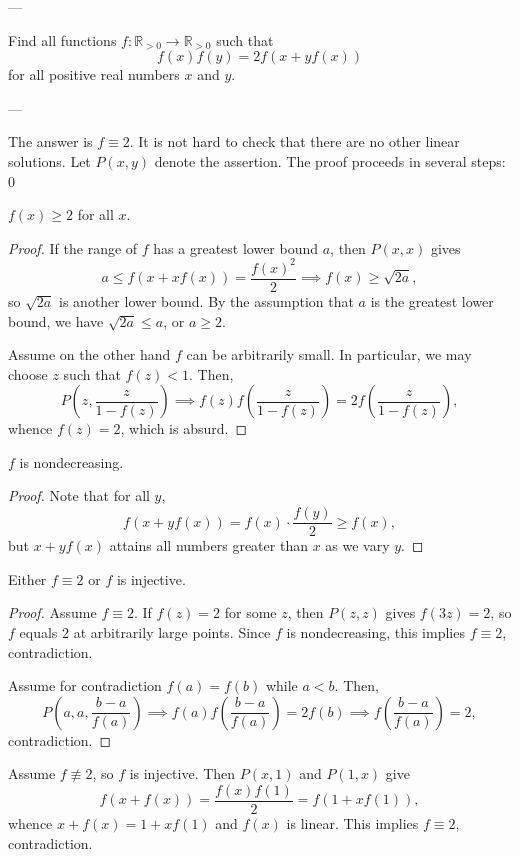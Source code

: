 
---

Find all functions $f:\mathbb R_{>0}\to\mathbb R_{>0}$ such that \[f(x)f(y)=2f(x+yf(x))\]
for all positive real numbers $x$ and $y$.

---

The answer is $f\equiv2$. It is not hard to check that there are no other linear solutions. Let $P(x,y)$ denote the assertion. The proof proceeds in several steps:
\setcounter{iclaim}0
\begin{iclaim}
    $f(x)\ge2$ for all $x$.
\end{iclaim}
\begin{proof}
    If the range of $f$ has a greatest lower bound $a$, then $P(x,x)$ gives \[a\le f(x+xf(x))=\frac{f(x)^2}2\implies f(x)\ge\sqrt{2a},\]
    so $\sqrt{2a}$ is another lower bound. By the assumption that $a$ is the greatest lower bound, we have $\sqrt{2a}\le a$, or $a\ge2$.

    Assume on the other hand $f$ can be arbitrarily small. In particular, we may choose $z$ such that $f(z)<1$. Then, \[P\left(z,\frac z{1-f(z)}\right)\implies f(z)f\left(\frac z{1-f(z)}\right)=2f\left(\frac z{1-f(z)}\right),\]
    whence $f(z)=2$, which is absurd.
\end{proof}
\begin{iclaim}
    $f$ is nondecreasing.
\end{iclaim}
\begin{proof}
    Note that for all $y$, \[f(x+yf(x))=f(x)\cdot\frac{f(y)}2\ge f(x),\]
    but $x+yf(x)$ attains all numbers greater than $x$ as we vary $y$.
\end{proof}
\begin{iclaim}
    Either $f\equiv2$ or $f$ is injective.
\end{iclaim}
\begin{proof}
    Assume $f\equiv2$. If $f(z)=2$ for some $z$, then $P(z,z)$ gives $f(3z)=2$, so $f$ equals $2$ at arbitrarily large points. Since $f$ is nondecreasing, this implies $f\equiv2$, contradiction.

    Assume for contradiction $f(a)=f(b)$ while $a<b$. Then, \[P\left(a,a,\frac{b-a}{f(a)}\right)\implies f(a)f\left(\frac{b-a}{f(a)}\right)=2f(b)\implies f\left(\frac{b-a}{f(a)}\right)=2,\]
    contradiction.
\end{proof}

Assume $f\not\equiv2$, so $f$ is injective. Then $P(x,1)$ and $P(1,x)$ give \[f(x+f(x))=\frac{f(x)f(1)}2=f(1+xf(1)),\]
whence $x+f(x)=1+xf(1)$ and $f(x)$ is linear. This implies $f\equiv2$, contradiction.

